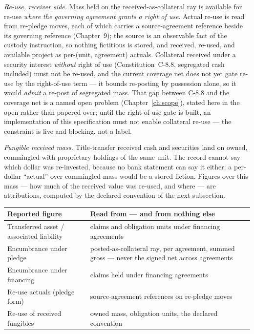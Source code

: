\emph{Re-use, receiver side.} Mass held on the received-as-collateral ray is
available for re-use \emph{where the governing agreement grants a right of use}.
Actual re-use is read from re-pledge moves, each of which
carries a source-agreement reference beside its governing reference
(Chapter~9); the source is an observable fact of the custody instruction, so
nothing fictitious is stored, and received, re-used, and available project as
per-(unit, agreement) actuals. Collateral received under a security interest
\emph{without} right of use (Constitution~C-8.8, segregated cash included) must
not be re-used, and the current coverage net does not yet gate re-use by the
right-of-use term --- it bounds re-posting by possession alone, so it would
\emph{admit} a re-post of segregated mass. That gap between C-8.8 and the coverage
net is a named open problem (Chapter~\ref{ch:scope}), stated here in the open rather
than papered over; until the right-of-use gate is built, an implementation of this
specification must not enable collateral re-use --- the constraint is live and
blocking, not a label.

\emph{Fungible received mass.} Title-transfer received cash and securities land
on owned, commingled with proprietary holdings of the same unit. The record
cannot say which dollar was re-invested, because no bank statement can say it
either: a per-dollar ``actual'' over commingled mass would be a stored fiction.
Figures over this mass --- how much of the received value was re-used, and where
--- are attributions, computed by the declared convention of the next
subsection.

\begin{center}
\begin{tabular}{@{}ll@{}}
\toprule
Reported figure & Read from --- and from nothing else \\
\midrule
Transferred asset / associated liability & claims and obligation units under financing agreements \\
Encumbrance under pledge & posted-as-collateral ray, per agreement, summed gross --- never the signed net across agreements \\
Encumbrance under financing & claims held under financing agreements \\
Re-use actuals (pledge form) & source-agreement references on re-pledge moves \\
Re-use of received fungibles & owned mass, obligation units, the declared convention \\
\bottomrule
\end{tabular}
\end{center}

